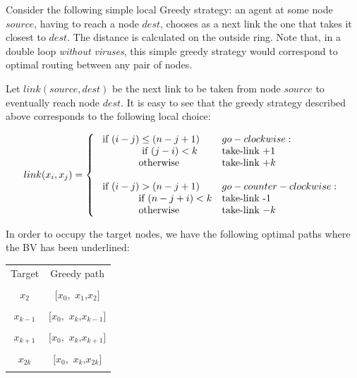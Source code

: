 Consider  the following simple local Greedy strategy: an agent at some node $source$, having to reach a node $dest$, chooses as a  next link the one that takes it closest to $dest$. The distance is calculated on the outside ring.
Note that, in a double loop {\em without viruses}, this simple greedy strategy  would correspond to optimal routing  
 between any pair of nodes. 



Let $link(source, dest)$ be the next link to be taken from node $source$ to eventually reach node $dest$.
It  is easy to see that the   greedy strategy described above corresponds to the following local choice:  %

\[
 link(x_i,x_j)  =    \left\{ \begin{array}{ll}
          \mbox{ if  $(i-j)\leq (n-j+1)$ }  &  go-clockwise:  \\
          \tab    \tab  \mbox  { if  $ (j-i)  <  k  $}   & \mbox  {take-link  +1}\\
                    \tab    \tab  \mbox  {otherwise}   & \mbox   {take-link  $+k $}\\

          \ \\
          \mbox{ if  $(i-j)> (n-j+1)$ }  &  go-counter-clockwise:  \\
          \tab   \tab \mbox  {if  $ (n-j+i)  <  k  $} &  \mbox  {take-link  -1}\\
                    \tab    \tab  \mbox  {otherwise}   & \mbox   {take-link  $-k $}\\
                          \end{array} \right. \] 
        
\noindent In order to occupy the target nodes, we have the following optimal paths where the BV has been underlined:

\begin{center}
  \begin{tabular}{|c|c|}
 \hline
 Target & Greedy path  \\
 &\\
 \hline
$x_2$ &$[x_0,$ \underline{$x_1$},$x_2]$\\
&\\
\hline
 $x_{k-1}$ & $[x_0,$ \underline{$x_k$},$x_{k-1}]$\\
 &\\
 \hline
 $x_{k+1}$ & $[x_0,$ \underline{$x_k$},$x_{k+1}]$\\
 &\\
 \hline
 $x_{2k}$ & $[x_0,$ \underline{$x_k$},$x_{2k}]$\\
 &\\
\hline
\end{tabular}
 
 \end{center}
  
